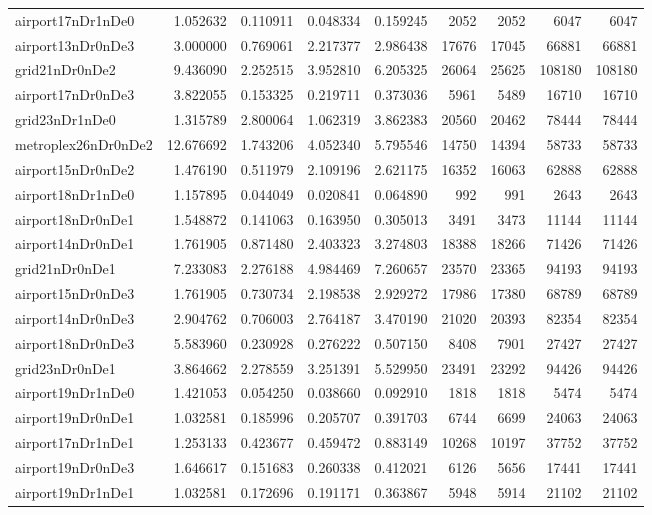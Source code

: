 \begin{longtable}{|l|r|r|r|r|r|r|r|r|}
airport17nDr1nDe0 & 1.052632 & 0.110911 & 0.048334 & 0.159245 & 2052 & 2052 & 6047 & 6047 \\
airport13nDr0nDe3 & 3.000000 & 0.769061 & 2.217377 & 2.986438 & 17676 & 17045 & 66881 & 66881 \\
grid21nDr0nDe2 & 9.436090 & 2.252515 & 3.952810 & 6.205325 & 26064 & 25625 & 108180 & 108180 \\
airport17nDr0nDe3 & 3.822055 & 0.153325 & 0.219711 & 0.373036 & 5961 & 5489 & 16710 & 16710 \\
grid23nDr1nDe0 & 1.315789 & 2.800064 & 1.062319 & 3.862383 & 20560 & 20462 & 78444 & 78444 \\
metroplex26nDr0nDe2 & 12.676692 & 1.743206 & 4.052340 & 5.795546 & 14750 & 14394 & 58733 & 58733 \\
airport15nDr0nDe2 & 1.476190 & 0.511979 & 2.109196 & 2.621175 & 16352 & 16063 & 62888 & 62888 \\
airport18nDr1nDe0 & 1.157895 & 0.044049 & 0.020841 & 0.064890 & 992 & 991 & 2643 & 2643 \\
airport18nDr0nDe1 & 1.548872 & 0.141063 & 0.163950 & 0.305013 & 3491 & 3473 & 11144 & 11144 \\
airport14nDr0nDe1 & 1.761905 & 0.871480 & 2.403323 & 3.274803 & 18388 & 18266 & 71426 & 71426 \\
grid21nDr0nDe1 & 7.233083 & 2.276188 & 4.984469 & 7.260657 & 23570 & 23365 & 94193 & 94193 \\
airport15nDr0nDe3 & 1.761905 & 0.730734 & 2.198538 & 2.929272 & 17986 & 17380 & 68789 & 68789 \\
airport14nDr0nDe3 & 2.904762 & 0.706003 & 2.764187 & 3.470190 & 21020 & 20393 & 82354 & 82354 \\
airport18nDr0nDe3 & 5.583960 & 0.230928 & 0.276222 & 0.507150 & 8408 & 7901 & 27427 & 27427 \\
grid23nDr0nDe1 & 3.864662 & 2.278559 & 3.251391 & 5.529950 & 23491 & 23292 & 94426 & 94426 \\
airport19nDr1nDe0 & 1.421053 & 0.054250 & 0.038660 & 0.092910 & 1818 & 1818 & 5474 & 5474 \\
airport19nDr0nDe1 & 1.032581 & 0.185996 & 0.205707 & 0.391703 & 6744 & 6699 & 24063 & 24063 \\
airport17nDr1nDe1 & 1.253133 & 0.423677 & 0.459472 & 0.883149 & 10268 & 10197 & 37752 & 37752 \\
airport19nDr0nDe3 & 1.646617 & 0.151683 & 0.260338 & 0.412021 & 6126 & 5656 & 17441 & 17441 \\
airport19nDr1nDe1 & 1.032581 & 0.172696 & 0.191171 & 0.363867 & 5948 & 5914 & 21102 & 21102 \\

\end{longtable}

